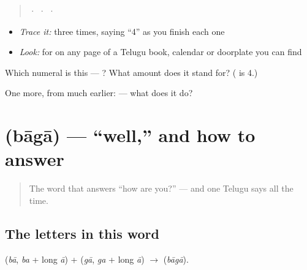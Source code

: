 \begin{quote}
  ·    ·    ·  
\end{quote}

\begin{itemize}
\raggedright
  \item \emph{Trace it:}  three times, saying \textquotedblleft{}4\textquotedblright{} as you finish each one
  \item \emph{Look:} for  on any page of a Telugu book, calendar or doorplate you can find
\end{itemize}

\begin{tcolorbox}[breakable,colback=teal!4,colframe=teal!35!black,title={Before you move on}]
Which numeral is this — ? What amount does it stand for? ( is 4.)

One more, from much earlier:  — what does it do?
\end{tcolorbox}
\section[\texorpdfstring{\te{బాగా} (bāgā)}{బాగా (bāgā)}]{ (bāgā) — \textquotedblleft{}well,\textquotedblright{} and how to answer}

\label{lesson:TE-C03-baagaa}



\begin{quote}
The word that answers \textquotedblleft{}how are you?\textquotedblright{} — and one Telugu says all the time.
\end{quote}

\subsection*{The letters in this word}
\textbf{} (\emph{bā}, \emph{ba} + long \emph{ā}) + \textbf{} (\emph{gā}, \emph{ga} + long \emph{ā}) $\to$ \textbf{} (\emph{bāgā}).

